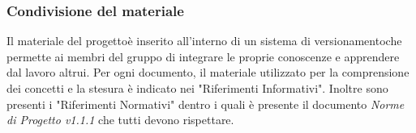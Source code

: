 		\subsubsection{Condivisione del materiale}
			Il materiale del progetto\glosp è inserito all'interno di un sistema di versionamento\glosp che permette ai membri del gruppo di integrare le proprie conoscenze e apprendere dal lavoro altrui.
			Per ogni documento, il materiale utilizzato per la comprensione dei concetti e la stesura è indicato nei "Riferimenti Informativi".
			Inoltre sono presenti i "Riferimenti Normativi" dentro i quali è presente il documento \textit{Norme di Progetto v1.1.1} che tutti devono rispettare.
